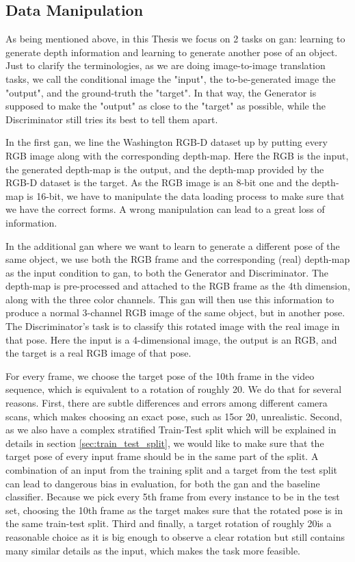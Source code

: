 \subsection{Data Manipulation}

As being mentioned above, in this Thesis we focus on 2 tasks on \acrshort{gan}: learning
to generate depth information and learning to generate another pose of an object. Just to
clarify the terminologies, as we are doing image-to-image translation tasks, we call the
conditional image the "input", the to-be-generated image the "output", and the
ground-truth the "target". In that way, the Generator is supposed to make the "output" as
close to the "target" as possible, while the Discriminator still tries its best to tell
them apart.

In the first \acrshort{gan}, we line the Washington RGB-D dataset up by putting every RGB
image along with the corresponding depth-map. Here the RGB is the input, the generated
depth-map is the output, and the depth-map provided by the RGB-D dataset is the target. As
the RGB image is an 8-bit one and the depth-map is 16-bit, we have to manipulate the data
loading process to make sure that we have the correct forms. A wrong manipulation can lead
to a great loss of information.

In the additional \acrshort{gan} where we want to learn to generate a different pose of
the same object, we use both the RGB frame and the corresponding (real) depth-map as the
input condition to \acrshort{gan}, to both the Generator and Discriminator. The depth-map
is pre-processed and attached to the RGB frame as the 4th dimension, along with the three
color channels. This \acrshort{gan} will then use this information to produce a normal
3-channel RGB image of the same object, but in another pose. The Discriminator's task is
to classify this rotated image with the real image in that pose. Here the input is a
4-dimensional image, the output is an RGB, and the target is a real RGB image of that
pose.

For every frame, we choose the target pose of the 10th frame in the video sequence, which
is equivalent to a rotation of roughly 20\degree. We do that for several reasons. First,
there are subtle differences and errors among different camera scans, which makes choosing
an exact pose, such as 15\degree or 20\degree, unrealistic. Second, as we also have a
complex stratified Train-Test split which will be explained in details in section
\ref{sec:train_test_split}, we would like to make sure that the target pose of every input
frame should be in the same part of the split. A combination of an input from the training
split and a target from the test split can lead to dangerous bias in evaluation, for both
the \acrshort{gan} and the baseline classifier. Because we pick every 5th frame from every
instance to be in the test set, choosing the 10th frame as the target makes sure that the
rotated pose is in the same train-test split. Third and finally, a target rotation of
roughly 20\degree is a reasonable choice as it is big enough to observe a clear rotation
but still contains many similar details as the input, which makes the task more feasible.

